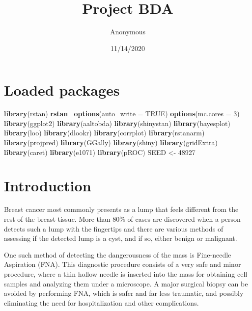 \documentclass[
]{article}
\title{Project BDA}
\author{Anonymous}
\date{11/14/2020}
\newenvironment{Shaded}{\begin{snugshade}}{\end{snugshade}}
\newcommand{\DataTypeTok}[1]{\textcolor[rgb]{0.13,0.29,0.53}{#1}}
\newcommand{\DecValTok}[1]{\textcolor[rgb]{0.00,0.00,0.81}{#1}}
\newcommand{\KeywordTok}[1]{\textcolor[rgb]{0.13,0.29,0.53}{\textbf{#1}}}
\newcommand{\NormalTok}[1]{#1}
\newcommand{\OtherTok}[1]{\textcolor[rgb]{0.56,0.35,0.01}{#1}}
\newcommand{\StringTok}[1]{\textcolor[rgb]{0.31,0.60,0.02}{#1}}
\begin{document}
\maketitle

{
\setcounter{tocdepth}{2}
\tableofcontents
}
\hypertarget{loaded-packages}{%
\section{Loaded packages}\label{loaded-packages}}

\begin{Shaded}
\begin{Highlighting}[]
\KeywordTok{library}\NormalTok{(rstan) }
\KeywordTok{rstan_options}\NormalTok{(}\DataTypeTok{auto_write =} \OtherTok{TRUE}\NormalTok{)}
\KeywordTok{options}\NormalTok{(}\DataTypeTok{mc.cores =} \DecValTok{3}\NormalTok{)}
\KeywordTok{library}\NormalTok{(ggplot2)}
\KeywordTok{library}\NormalTok{(aaltobda)}
\KeywordTok{library}\NormalTok{(shinystan)}
\KeywordTok{library}\NormalTok{(bayesplot)}
\KeywordTok{library}\NormalTok{(loo)}
\KeywordTok{library}\NormalTok{(dlookr)}
\KeywordTok{library}\NormalTok{(corrplot)}
\KeywordTok{library}\NormalTok{(rstanarm)}
\KeywordTok{library}\NormalTok{(projpred)}
\KeywordTok{library}\NormalTok{(GGally)}
\KeywordTok{library}\NormalTok{(shiny)}
\KeywordTok{library}\NormalTok{(gridExtra)}
\KeywordTok{library}\NormalTok{(caret)}
\KeywordTok{library}\NormalTok{(e1071)}
\KeywordTok{library}\NormalTok{(pROC)}
\NormalTok{SEED <-}\StringTok{ }\DecValTok{48927}
\end{Highlighting}
\end{Shaded}

\newpage

\hypertarget{introduction}{%
\section{Introduction}\label{introduction}}

Breast cancer most commonly presents as a lump that feels different from
the rest of the breast tissue. More than 80\% of cases are discovered
when a person detects such a lump with the fingertips and there are
various methods of assessing if the detected lump is a cyst, and if so,
either benign or malignant.

One such method of detecting the dangerousness of the mass is
Fine-needle Aspiration (FNA). This diagnostic procedure consists of a
very safe and minor procedure, where a thin hollow needle is inserted
into the mass for obtaining cell samples and analyzing them under a
microscope. A major surgical biopsy can be avoided by performing FNA,
which is safer and far less traumatic, and possibly eliminating the need
for hospitalization and other complications.
\end{document}
